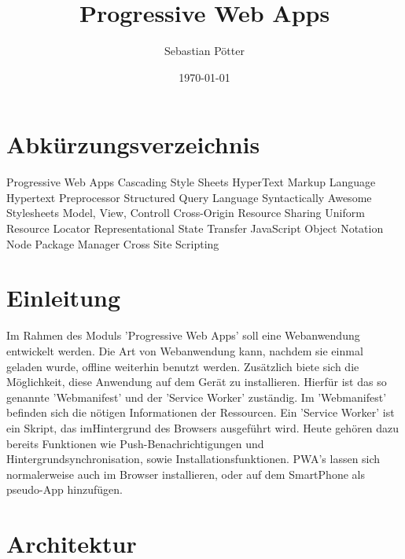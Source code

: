 \documentclass[12pt]{article}
\title{Progressive Web Apps}
\author{Sebastian Pötter}
\date{\today}
\begin{document}
    
    \newpage
    

    \tableofcontents
    
    \newpage
        
    \section*{Abkürzungsverzeichnis}
        \begin{acronym}
             {Progressive Web Apps}
             {Cascading Style Sheets}
             {HyperText Markup Language}
             {Hypertext Preprocessor}
             {Structured Query Language}
             {Syntactically Awesome Stylesheets}
             {Model, View, Controll}
             {Cross-Origin Resource Sharing}
             {Uniform Resource Locator}
             {Representational State Transfer}
             {JavaScript Object Notation}
             {Node Package Manager}
             {Cross Site Scripting}
        \end{acronym}
    
    \newpage
    
    
    \section{Einleitung}
    
Im Rahmen des Moduls 'Progressive Web Apps' soll eine Webanwendung entwickelt werden. Die Art von Webanwendung kann, nachdem sie einmal geladen wurde, offline weiterhin benutzt werden. Zusätzlich biete sich die Möglichkeit, diese Anwendung auf dem Gerät zu installieren. Hierfür ist das so genannte 'Webmanifest' und der 'Service Worker' zuständig. Im 'Webmanifest' befinden sich die nötigen Informationen der Ressourcen. Ein 'Service Worker' ist ein Skript, das imHintergrund des Browsers ausgeführt wird.  Heute gehören dazu bereits Funktionen wie Push-Benachrichtigungen und Hintergrundsynchronisation, sowie Installationsfunktionen. PWA's lassen sich normalerweise auch im Browser installieren, oder auf dem SmartPhone als pseudo-App hinzufügen. 
    
    \section{Architektur}
    
\end{document}
